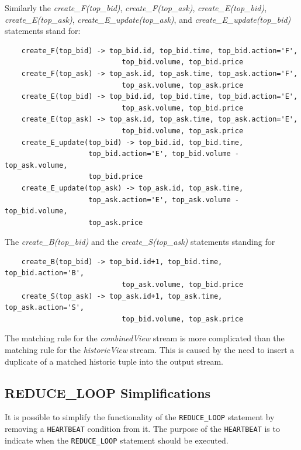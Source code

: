 \documentclass{article}
\begin{document}
Similarly the \emph{create\_F(top\_bid)}, \emph{create\_F(top\_ask)}, \emph{create\_E(top\_bid)}, \emph{create\_E(top\_ask)}, \emph{create\_E\_update(top\_ask)}, and \emph{create\_E\_update(top\_bid)} statements stand for:

\begin{verbatim}
    create_F(top_bid) -> top_bid.id, top_bid.time, top_bid.action='F',
                            top_bid.volume, top_bid.price
    create_F(top_ask) -> top_ask.id, top_ask.time, top_ask.action='F',
                            top_ask.volume, top_ask.price
    create_E(top_bid) -> top_bid.id, top_bid.time, top_bid.action='E',
                            top_ask.volume, top_bid.price
    create_E(top_ask) -> top_ask.id, top_ask.time, top_ask.action='E',
                            top_bid.volume, top_ask.price
    create_E_update(top_bid) -> top_bid.id, top_bid.time,
                    top_bid.action='E', top_bid.volume - top_ask.volume,
                    top_bid.price
    create_E_update(top_ask) -> top_ask.id, top_ask.time,
                    top_ask.action='E', top_ask.volume - top_bid.volume,
                    top_ask.price
\end{verbatim}

\noindent The \emph{create\_B(top\_bid)} and the \emph{create\_S(top\_ask)} statements standing for 

\begin{verbatim}
    create_B(top_bid) -> top_bid.id+1, top_bid.time, top_bid.action='B',
                            top_ask.volume, top_bid.price
    create_S(top_ask) -> top_ask.id+1, top_ask.time, top_ask.action='S',
                            top_bid.volume, top_ask.price
\end{verbatim}

The matching rule for the \emph{combinedView} stream is more complicated than the matching rule for the \emph{historicView} stream. This is caused by the need to insert a duplicate of a matched historic tuple into the output stream.

\subsection{REDUCE\_LOOP Simplifications}

It is possible to simplify the functionality of the {\tt REDUCE\_LOOP} statement by removing a {\tt HEARTBEAT} condition from it. The purpose of the {\tt HEARTBEAT} is to indicate when the {\tt REDUCE\_LOOP} statement should be executed. 
\end{document}
